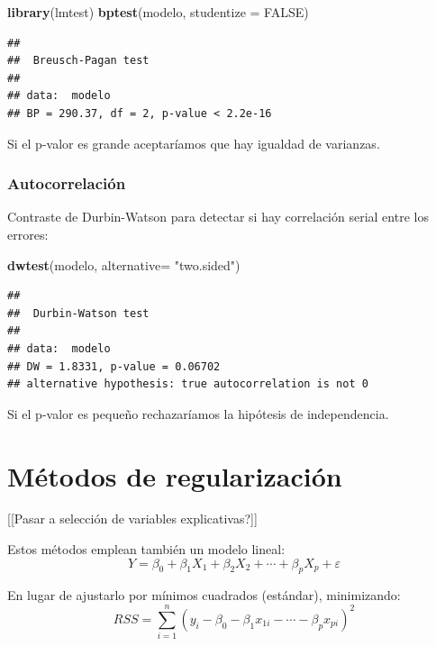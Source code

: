 \documentclass[]{book}
\newenvironment{Shaded}{\begin{snugshade}}{\end{snugshade}}
\newcommand{\KeywordTok}[1]{\textcolor[rgb]{0.13,0.29,0.53}{\textbf{#1}}}
\newcommand{\DataTypeTok}[1]{\textcolor[rgb]{0.13,0.29,0.53}{#1}}
\newcommand{\StringTok}[1]{\textcolor[rgb]{0.31,0.60,0.02}{#1}}
\newcommand{\OtherTok}[1]{\textcolor[rgb]{0.56,0.35,0.01}{#1}}
\newcommand{\NormalTok}[1]{#1}
\begin{document}
\begin{Shaded}
\begin{Highlighting}[]
\KeywordTok{library}\NormalTok{(lmtest)}
\KeywordTok{bptest}\NormalTok{(modelo, }\DataTypeTok{studentize =} \OtherTok{FALSE}\NormalTok{)}
\end{Highlighting}
\end{Shaded}

\begin{verbatim}
## 
##  Breusch-Pagan test
## 
## data:  modelo
## BP = 290.37, df = 2, p-value < 2.2e-16
\end{verbatim}

Si el p-valor es grande aceptaríamos que hay igualdad de varianzas.

\subsubsection{Autocorrelación}\label{autocorrelacion}

Contraste de Durbin-Watson para detectar si hay correlación serial entre
los errores:

\begin{Shaded}
\begin{Highlighting}[]
\KeywordTok{dwtest}\NormalTok{(modelo, }\DataTypeTok{alternative=} \StringTok{"two.sided"}\NormalTok{)}
\end{Highlighting}
\end{Shaded}

\begin{verbatim}
## 
##  Durbin-Watson test
## 
## data:  modelo
## DW = 1.8331, p-value = 0.06702
## alternative hypothesis: true autocorrelation is not 0
\end{verbatim}

Si el p-valor es pequeño rechazaríamos la hipótesis de independencia.

\section{Métodos de regularización}\label{metodos-de-regularizacion}

{[}{[}Pasar a selección de variables explicativas?{]}{]}

Estos métodos emplean también un modelo lineal:
\[Y=\beta_{0}+\beta_{1}X_{1}+\beta_{2}X_{2}+\cdots+\beta_{p}X_{p}+\varepsilon\]

En lugar de ajustarlo por mínimos cuadrados (estándar), minimizando:
\[ RSS = \sum\limits_{i=1}^{n}\left(  y_{i} - \beta_0 - \beta_1 x_{1i} - \cdots - \beta_p x_{pi} \right)^{2}\]
\end{document}
